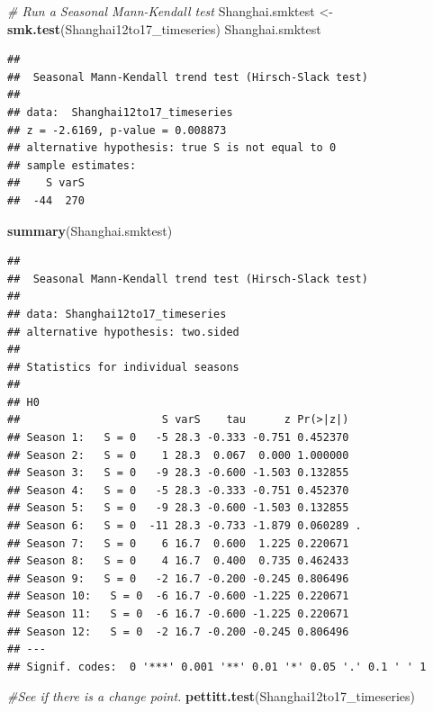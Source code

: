 \documentclass[12pt,]{article}
\newenvironment{Shaded}{\begin{snugshade}}{\end{snugshade}}
\newcommand{\KeywordTok}[1]{\textcolor[rgb]{0.13,0.29,0.53}{\textbf{#1}}}
\newcommand{\StringTok}[1]{\textcolor[rgb]{0.31,0.60,0.02}{#1}}
\newcommand{\CommentTok}[1]{\textcolor[rgb]{0.56,0.35,0.01}{\textit{#1}}}
\newcommand{\NormalTok}[1]{#1}
\begin{document}
\begin{Shaded}
\begin{Highlighting}[]
\CommentTok{# Run a Seasonal Mann-Kendall test}
\NormalTok{Shanghai.smktest <-}\StringTok{ }\KeywordTok{smk.test}\NormalTok{(Shanghai12to17_timeseries)}
\NormalTok{Shanghai.smktest}
\end{Highlighting}
\end{Shaded}

\begin{verbatim}
## 
##  Seasonal Mann-Kendall trend test (Hirsch-Slack test)
## 
## data:  Shanghai12to17_timeseries
## z = -2.6169, p-value = 0.008873
## alternative hypothesis: true S is not equal to 0
## sample estimates:
##    S varS 
##  -44  270
\end{verbatim}

\begin{Shaded}
\begin{Highlighting}[]
\KeywordTok{summary}\NormalTok{(Shanghai.smktest)}
\end{Highlighting}
\end{Shaded}

\begin{verbatim}
## 
##  Seasonal Mann-Kendall trend test (Hirsch-Slack test)
## 
## data: Shanghai12to17_timeseries
## alternative hypothesis: two.sided
## 
## Statistics for individual seasons
## 
## H0
##                      S varS    tau      z Pr(>|z|)  
## Season 1:   S = 0   -5 28.3 -0.333 -0.751 0.452370  
## Season 2:   S = 0    1 28.3  0.067  0.000 1.000000  
## Season 3:   S = 0   -9 28.3 -0.600 -1.503 0.132855  
## Season 4:   S = 0   -5 28.3 -0.333 -0.751 0.452370  
## Season 5:   S = 0   -9 28.3 -0.600 -1.503 0.132855  
## Season 6:   S = 0  -11 28.3 -0.733 -1.879 0.060289 .
## Season 7:   S = 0    6 16.7  0.600  1.225 0.220671  
## Season 8:   S = 0    4 16.7  0.400  0.735 0.462433  
## Season 9:   S = 0   -2 16.7 -0.200 -0.245 0.806496  
## Season 10:   S = 0  -6 16.7 -0.600 -1.225 0.220671  
## Season 11:   S = 0  -6 16.7 -0.600 -1.225 0.220671  
## Season 12:   S = 0  -2 16.7 -0.200 -0.245 0.806496  
## ---
## Signif. codes:  0 '***' 0.001 '**' 0.01 '*' 0.05 '.' 0.1 ' ' 1
\end{verbatim}

\begin{Shaded}
\begin{Highlighting}[]
\CommentTok{#See if there is a change point.}
\KeywordTok{pettitt.test}\NormalTok{(Shanghai12to17_timeseries)}
\end{Highlighting}
\end{Shaded}
\end{document}
